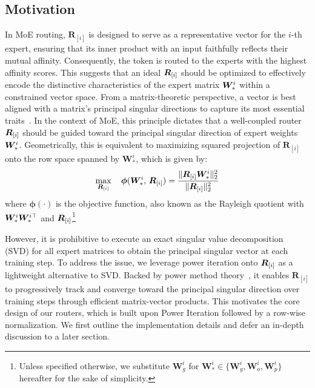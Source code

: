 \documentclass[11pt]{article}
\begin{document}
\subsection{Motivation}
\label{sec:motivation}
In MoE routing, \(\mathbf{R}_{[i]}\) is designed to serve as a representative vector for the \(i\)-th expert, ensuring that its inner product with an input faithfully reflects their mutual affinity. 
Consequently, the token is routed to the experts with the highest affinity scores.
This suggests that an ideal \({\bm{R}}_{[i]}\) should be optimized to effectively encode the distinctive characteristics of the expert matrix \({\bm{W}}_*^i\) within a constrained vector space. 
From a matrix-theoretic perspective, a vector is best aligned with a matrix’s principal singular directions to capture its most essential traits~\cite{Eckart1936TheAO}. 
In the context of MoE, this principle dictates that a well-coupled router \({\bm{R}}_{[i]}\) should be guided toward the principal singular direction of expert weights ${\bm{W}}_*^i$. 
Geometrically, this is equivalent to maximizing squared projection of \(\mathbf{R}_{[i]}\) onto the row space spanned by \(\mathbf{W}_*^i\), which is given by:
\begin{equation}
    \max_{{\bm{R}}_{[i]}} \quad {\bm{\phi}({\bm{W}}_{*}^i, \, {\bm{R}}_{[i]}) = \frac{\|{\bm{R}}_{[i]}{\bm{W}}_*^i\|_2^2}{\|{\bm{R}}_{[i]}\|_2^2}} 
    \label{eq:objective} 
\end{equation}
where $\bm{\phi}(\cdot)$ is the objective function, also known as the Rayleigh quotient with  ${\bm{W}}_*^i{\bm{W}}_*^{i\top}$ and ${\bm{R}}_{[i]}$\footnote{
Unless specified otherwise, we substitute $\mathbf{W}_g^i$ for $\mathbf{W}_*^i \in \{\mathbf{W}_g^i, \mathbf{W}_o^i, \mathbf{W}_p^i\}$ hereafter for the sake of simplicity.
}

However, it is prohibitive to execute an exact singular value decomposition (SVD) for all expert matrices to obtain the principal singular vector at each training step.
To address the issue, we leverage power iteration onto ${\bm{R}}_{[i]}$ as a lightweight alternative to SVD. 
Backed by power method theory~\cite{matrixcomputation}, it enables $\mathbf{R}_{[i]}$ to progressively track and converge toward the principal singular direction over training steps through efficient matrix-vector products.
This motivates the core design of our routers, which is built upon Power Iteration followed by a row-wise normalization.
We first outline the implementation details and defer an in-depth discussion to a later section.
\end{document}
